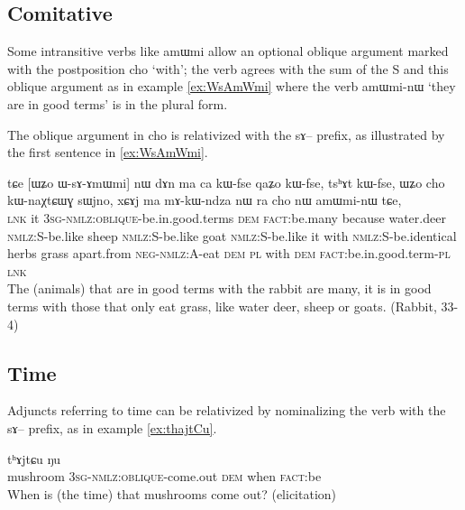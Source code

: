\documentclass[oldfontcommands,oneside,a4paper,11pt]{article}
\newcommand{\ipa}[1]{{\phon #1}} %
\newcommand{\topic}{\textsc{dem}}
\begin{document}
\subsection{Comitative} \label{sec:rel:comitative}
Some intransitive verbs like \ipa{amɯmi}  allow an optional oblique argument marked with the postposition \ipa{cho} `with'; the verb agrees with the sum of the S and this oblique argument as in example \ref{ex:WsAmWmi} where the verb 	\ipa{amɯmi-nɯ}  `they are in good terms' is in the plural form.
 

The oblique argument in \ipa{cho} is relativized with the \ipa{sɤ}-- prefix, as illustrated by the first sentence in \ref{ex:WsAmWmi}.
\begin{exe}
   \ex \label{ex:WsAmWmi}
 \gll 
\ipa{tɕe}   	[\ipa{ɯʑo}   	\ipa{ɯ-sɤ-ɤmɯmi}]   	\ipa{nɯ}   	\ipa{dɤn}   	\ipa{ma}   	\ipa{ca}   	\ipa{kɯ-fse}   	\ipa{qaʑo}   	\ipa{kɯ-fse,}   	\ipa{tsʰɤt}   	\ipa{kɯ-fse,}   	 \ipa{ɯʑo}   	\ipa{cho}   	\ipa{kɯ-naχtɕɯɣ}   	\ipa{sɯjno,}   	\ipa{xɕɤj}   	\ipa{ma}   	\ipa{mɤ-kɯ-ndza}   	\ipa{nɯ} \ipa{ra}   	\ipa{cho}   	\ipa{nɯ}   	\ipa{amɯmi-nɯ}   	\ipa{tɕe,}   \\
\textsc{lnk} it \textsc{3sg-nmlz:oblique}-be.in.good.terms \topic{} \textsc{fact:}be.many because water.deer \textsc{nmlz:S}-be.like sheep \textsc{nmlz:S}-be.like goat  \textsc{nmlz:S}-be.like it with  \textsc{nmlz:S}-be.identical herbs grass apart.from \textsc{neg-nmlz:A}-eat \textsc{dem} \textsc{pl} with \textsc{dem} \textsc{fact}:be.in.good.term-\textsc{pl} \textsc{lnk} \\
\glt The (animals) that are in good terms with the rabbit are many, it is in good terms with those that only eat grass, like water deer, sheep or goats. (Rabbit, 33-4)
\end{exe}

\subsection{Time} \label{sec:rel:time}

Adjuncts referring to   time can be relativized by nominalizing the verb with the \ipa{sɤ}-- prefix, as in example \ref{ex:thajtCu}.

\begin{exe}
   \ex \label{ex:thajtCu}
 \gll [\ipa{tɤjmɤɣ}   	\ipa{ɯ-sɤɣ-ɬoʁ}]   	\ipa{nɯ}   	\ipa{tʰɤjtɕu}   	\ipa{ŋu}   \\
 mushroom \textsc{3sg-nmlz:oblique}-come.out \topic{} when \textsc{fact}:be \\
 \glt When is (the time) that mushrooms come out? (elicitation)
\end{exe}
\end{document}
